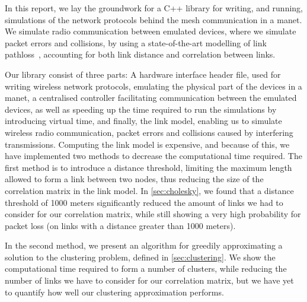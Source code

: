 In this report, we lay the groundwork for a C++ library for writing, and running, simulations of the network protocols behind the mesh communication in a \gls{manet}. We simulate radio communication between emulated devices, where we simulate packet errors and collisions, by using a state-of-the-art modelling of link \gls{pathloss}~\cite{paper:linkmodel}, accounting for both link distance and correlation between links. \medbreak

Our library consist of three parts: A hardware interface header file, used for writing wireless network protocols, emulating the physical part of the devices in a \gls{manet}, a centralised controller facilitating communication between the emulated devices, as well as speeding up the time required to run the simulations by introducing virtual time, and finally, the link model, enabling us to simulate wireless radio communication, packet errors and collisions caused by interfering transmissions. Computing the link model is expensive, and because of this, we have implemented two methods to decrease the computational time required. \smallbreak
The first method is to introduce a distance threshold, limiting the maximum length allowed to form a link between two nodes, thus reducing the size of the correlation matrix in the link model. In \autoref{sec:cholesky}, we found that a distance threshold of 1000 meters significantly reduced the amount of links we had to consider for our correlation matrix, while still showing a very high probability for packet loss (on links with a distance greater than 1000 meters). \smallbreak

In the second method, we present an algorithm for greedily approximating a solution to the clustering problem, defined in \autoref{sec:clustering}. We show the computational time required to form a number of clusters, while reducing the number of links we have to consider for our correlation matrix, but we have yet to quantify how well our clustering approximation performs. \smallbreak



